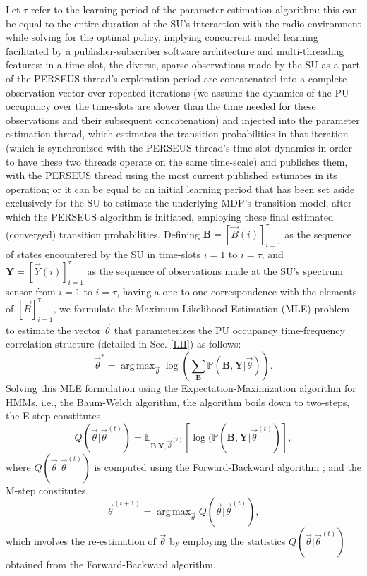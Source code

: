 \documentclass[12pt, draftcls, onecolumn]{IEEEtran}
\DeclareMathOperator*{\argmax}{arg\,max}
\begin{document}
Let $\tau$ refer to the learning period of the parameter estimation algorithm: this can be equal to the entire duration of the SU's interaction with the radio environment while solving for the optimal policy, implying concurrent model learning facilitated by a publisher-subscriber software architecture and multi-threading features: in a time-slot, the diverse, sparse observations made by the SU as a part of the PERSEUS thread's exploration period are concatenated into a complete observation vector over repeated iterations (we assume the dynamics of the PU occupancy over the time-slots are slower than the time needed for these observations and their subsequent concatenation) and injected into the parameter estimation thread, which estimates the transition probabilities in that iteration (which is synchronized with the PERSEUS thread's time-slot dynamics in order to have these two threads operate on the same time-scale) and publishes them, with the PERSEUS thread using the most current published estimates in its operation; or it can  be equal to an initial learning period that has been set aside exclusively for the SU to estimate the underlying MDP's transition model, after which the PERSEUS algorithm is initiated, employing these final estimated (converged) transition probabilities. Defining $\mathbf{B}{=}[\vec{B}(i)]_{i{=}1}^{\tau}$ as the sequence of states encountered by the SU in time-slots $i{=}1$ to $i{=}\tau$, and $\mathbf{Y}{=}[\vec{Y}(i)]_{i{=}1}^{\tau}$ as the sequence of observations made at the SU's spectrum sensor from $i{=}1$ to $i{=}\tau$, having a one-to-one correspondence with the elements of $[\vec{B}]_{i{=}1}^{\tau}$, we formulate the Maximum Likelihood Estimation (MLE) problem to estimate the vector $\vec{\theta}$ that parameterizes the PU occupancy time-frequency correlation structure (detailed in Sec. \ref{I.II}) as follows:
\begin{equation}\label{19}
    \vec{\theta}^{*}=\argmax_{\vec{\theta}}\log{\left(\sum_{\mathbf{B}}\mathbb{P}(\mathbf{B},\mathbf{Y}|\vec{\theta})\right)}.
\end{equation}
Solving this MLE formulation using the Expectation-Maximization algorithm \cite{WCL:14} for HMMs, i.e., the Baum-Welch algorithm, the algorithm boils down to two-steps, the E-step constitutes
\begin{equation}\label{20}
    Q(\vec{\theta}|\vec{\theta}^{(t)})=\mathbb{E}_{\mathbf{B}|\mathbf{Y},\vec{\theta}^{(t)}}\left[\log{(\mathbb{P}(\mathbf{B},\mathbf{Y}|\vec{\theta}^{(t)})}\right],
\end{equation}
where $Q(\vec{\theta}|\vec{\theta}^{(t)})$ is computed using the Forward-Backward algorithm \cite{WCL:14}; and the M-step constitutes
\begin{equation}\label{21}
    \vec{\theta}^{(t+1)}=\argmax_{\vec{\theta}}Q(\vec{\theta}|\vec{\theta}^{(t)}),
\end{equation}
which involves the re-estimation of $\vec{\theta}$ by employing the statistics $Q(\vec{\theta}|\vec{\theta}^{(t)})$ obtained from the Forward-Backward algorithm.
\end{document}
